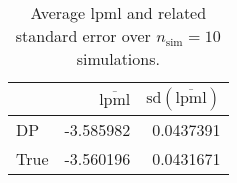 \begin{table}[H]

\caption{Average lpml and related standard error over $n_{\text{sim}} = 10$ simulations.}
\centering
\begin{tabular}[t]{lrr}
\toprule
  & $\overbar{\text{lpml}}$ & $\text{sd}(\overbar{\text{lpml}})$\\
\midrule
DP & -3.585982 & 0.0437391\\
True & -3.560196 & 0.0431671\\
\bottomrule
\end{tabular}
\end{table}